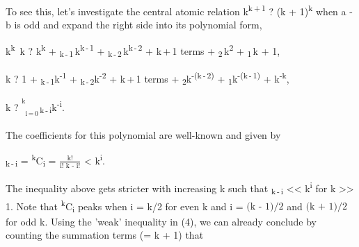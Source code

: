\documentclass[a4paper,10pt]{article}
\begin{document}
\begin{flushleft}
{{	To see this, let's investigate the central atomic relation k\textsuperscript{k\,+\,1} ? (k + 1)\textsuperscript{k} when a - b is odd and expand the right side into its polynomial form,
	\vspace{2mm}
	\begin{center}
	k\textsuperscript{k}\,{\cdot} k ? k\textsuperscript{k} + \upalpha\textsubscript{k\,-\,1}\,k\textsuperscript{k\,-\,1} + \upalpha\textsubscript{k\,-\,2}\,k\textsuperscript{k\,-\,2} + {\cdot\cdot\cdot} {\scriptsize k\,+\,1 terms} {\cdot\cdot\cdot} + \upalpha\textsubscript{2}\,k\textsuperscript{2} + \upalpha\textsubscript{1}\,k + 1,
	\end{center}
	\vspace{2mm}
	\begin{center}
	k ? 1 + \upalpha\textsubscript{k\,-\,1}k\textsuperscript{-1} + \upalpha\textsubscript{k\,-\,2}k\textsuperscript{-2} + {\cdot\cdot\cdot} {\scriptsize k\,+\,1 terms} {\cdot\cdot\cdot} + \upalpha\textsubscript{2}k\textsuperscript{-(k\,-\,2)} + \upalpha\textsubscript{1}k\textsuperscript{-(k\,-\,1)} + k\textsuperscript{-k},
	\end{center}
	\vspace{2mm}
	\begin{center}
	k ? {{\Large{}}\hspace{0.3mm}\textsuperscript{\textsuperscript{\scriptsize{${\text{k}}$}}}}{\hspace{-1.8mm}\textsubscript{\textsubscript{\scriptsize{i\,=\,0}}}}\,\upalpha\textsubscript{k\,-\,i}k\textsuperscript{-i}.
	\end{center}
	\begin{flushright}
		{\vspace{-7.5mm}}
	\end{flushright}
	\vspace{2mm}
	The coefficients for this polynomial are well-known and given by 
	\vspace{2mm}
	\begin{center}
	\upalpha\textsubscript{k\,-\,i} = \textsuperscript{k}C\textsubscript{i} = $\displaystyle\frac{\text{k!}}{\text{i! k - i!}}$ < k\textsuperscript{i}.
	\end{center}
	\begin{flushright}
		{\vspace{-7.5mm}\mono{(4)}}
	\end{flushright}
	\vspace{2mm}
	The inequality above gets stricter with increasing k such that \upalpha\textsubscript{k\,-\,i} << k\textsuperscript{i} for k >> 1. Note that \textsuperscript{k}C\textsubscript{i} peaks when i = k/2 for even k and i = ${\text{(k - 1)}}{\text{/2}}$ and ${\text{(k + 1)}}{\text{/2}}$ for odd k. Using the 'weak' inequality in (4), we can already conclude by counting the summation terms (= k + 1) that
}}
\end{flushleft}
\end{document}
